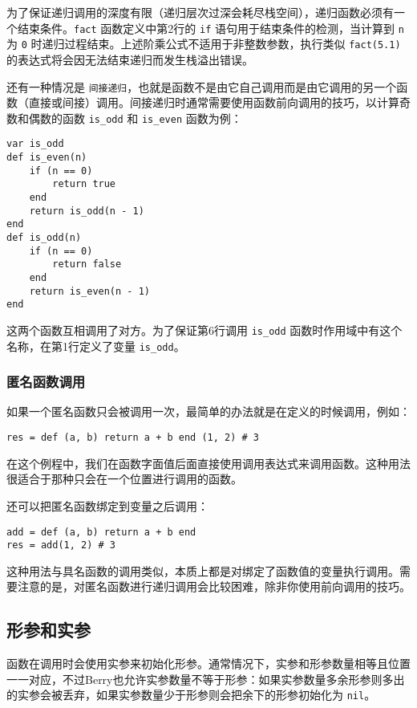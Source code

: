 为了保证递归调用的深度有限（递归层次过深会耗尽栈空间），递归函数必须有一个结束条件。\texttt{fact} 函数定义中第2行的 \texttt{if} 语句用于结束条件的检测，当计算到 \texttt{n} 为 \texttt{0} 时递归过程结束。上述阶乘公式不适用于非整数参数，执行类似 \texttt{fact(5.1)} 的表达式将会因无法结束递归而发生栈溢出错误。

还有一种情况是 \texttt{间接递归}，也就是函数不是由它自己调用而是由它调用的另一个函数（直接或间接）调用。间接递归时通常需要使用函数前向调用的技巧，以计算奇数和偶数的函数 \texttt{is\_odd} 和 \texttt{is\_even} 函数为例：
\begin{lstlisting}[language=berry]
var is_odd
def is_even(n)
    if (n == 0)
        return true
    end
    return is_odd(n - 1) 
end
def is_odd(n)
    if (n == 0)
        return false
    end
    return is_even(n - 1) 
end
\end{lstlisting}
这两个函数互相调用了对方。为了保证第6行调用 \texttt{is\_odd} 函数时作用域中有这个名称，在第1行定义了变量 \texttt{is\_odd}。

\subsubsection{匿名函数调用}

如果一个匿名函数只会被调用一次，最简单的办法就是在定义的时候调用，例如：
\begin{lstlisting}[language=berry, numbers=none]
res = def (a, b) return a + b end (1, 2) # 3
\end{lstlisting}
在这个例程中，我们在函数字面值后面直接使用调用表达式来调用函数。这种用法很适合于那种只会在一个位置进行调用的函数。

还可以把匿名函数绑定到变量之后调用：
\begin{lstlisting}[language=berry, numbers=none]
add = def (a, b) return a + b end
res = add(1, 2) # 3
\end{lstlisting}
这种用法与具名函数的调用类似，本质上都是对绑定了函数值的变量执行调用。需要注意的是，对匿名函数进行递归调用会比较困难，除非你使用前向调用的技巧。

\subsection{形参和实参}

函数在调用时会使用实参来初始化形参。通常情况下，实参和形参数量相等且位置一一对应，不过Berry也允许实参数量不等于形参：如果实参数量多余形参则多出的实参会被丢弃，如果实参数量少于形参则会把余下的形参初始化为 \texttt{nil}。

